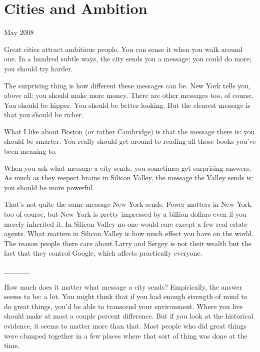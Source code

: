 \chapter{Cities and Ambition}


            
              
                

May 2008


                  Great cities attract ambitious people. You can sense it when
                  you walk around one. In a hundred subtle ways, the city sends
                  you a message: you could do more; you should try harder.

The
                  surprising thing is how different these messages can be. New
                  York tells you, above all: you should make more money. There
                  are other messages too, of course. You should be hipper. You
                  should be better looking. But the clearest message is that you
                  should be richer.

What I like about Boston (or
                  rather Cambridge) is that the message there is: you should be
                  smarter. You really should get around to reading all those
                  books you've been meaning to.

When you ask what
                  message a city sends, you sometimes get surprising answers. As
                  much as they respect brains in Silicon Valley, the message the
                  Valley sends is: you should be more powerful.

That's
                  not quite the same message New York sends. Power matters in
                  New York too of course, but New York is pretty impressed by a
                  billion dollars even if you merely inherited it. In Silicon
                  Valley no one would care except a few real estate agents. What
                  matters in Silicon Valley is how much effect you have on the
                  world. The reason people there care about Larry and Sergey is
                  not their wealth but the fact that they control Google, which
                  affects practically everyone.


                  \_\_\_\_\_
                  

How much does it matter what message a city sends?
                  Empirically, the answer seems to be: a lot. You might think
                  that if you had enough strength of mind to do great things,
                  you'd be able to transcend your environment. Where you live
                  should make at most a couple percent difference. But if you
                  look at the historical evidence, it seems to matter more than
                  that. Most people who did great things were clumped together
                  in a few places where that sort of thing was done at the
                  time.

